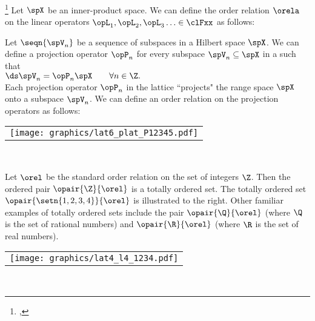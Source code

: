 \begin{example}
\footnote{
  ,
  }
\label{ex:order_operator}
Let $\spX$ be an inner-product space.
We can define the order relation $\orela$ on the linear operators 
$\opL_1,\opL_2,\opL_3\ldots\in\clFxx$ as follows:
\exbox{ \opL_1 \orela \opL_2 \qquad\iffdef\qquad \inprod{\opL_2\vx-\opL_1\vx}{\vx} \ge 0
        \qquad\forall \vx\in\spX}
\end{example}




\begin{minipage}[c]{\tw-43mm}%
  \begin{example}
  \label{ex:order_projection_op}
  \footnotemark
  Let $\seqn{\spV_n}$ be a sequence of subspaces in a Hilbert space $\spX$.
  We can define a projection operator $\opP_n$ for every subspace $\spV_n\subseteq\spX$ 
  in a  such that 
  \\\indentx
    $\ds \spV_n = \opP_n\spX \qquad \forall n\in\Z.$
  \\
  Each projection operator $\opP_n$ in the lattice ``projects" the range space $\spX$
  onto a subspace $\spV_n$.
  We can define an order relation on the projection operators as follows:
  \end{example}
\end{minipage}%
%
\hfill\begin{tabular}{c}\texttt{[image: graphics/lat6\_plat\_P12345.pdf]}\end{tabular}\hfill\mbox{}\\%

\begin{minipage}{\tw-20mm}%
  \begin{example}
  \label{ex:order_int}
  Let $\orel$ be the standard order relation on the set of integers $\Z$.
  Then the ordered pair $\opair{\Z}{\orel}$ is a totally ordered set.
  The totally ordered set $\opair{\setn{1,2,3,4}}{\orel}$ is illustrated to the 
  right.
  Other familiar examples of totally ordered sets include the 
  pair $\opair{\Q}{\orel}$ (where $\Q$ is the set of rational numbers)
  and  $\opair{\R}{\orel}$ (where $\R$ is the set of real numbers).
  \end{example}
\end{minipage}%
\hfill\begin{tabular}{c}\texttt{[image: graphics/lat4\_l4\_1234.pdf]}\end{tabular}\hfill\mbox{}\\%

